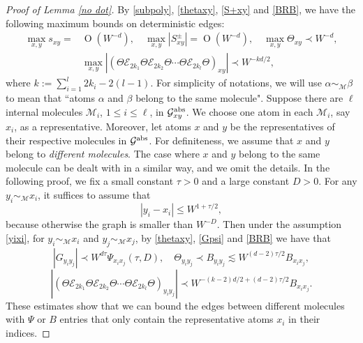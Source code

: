 \documentclass{article}
\newcommand{\1}{\mathds{1}}
\numberwithin{equation}{section}
\newcommand{\al}{\alpha}
\newcommand{\be}{\begin{equation}}
\newcommand{\ee}{\end{equation}}
\renewcommand{\cal}{\mathcal}
\renewcommand{\leq}{\leqslant}
\renewcommand{\le}{\leq}
\newcommand{\dashed}{\text{diffusive}}
\newcommand{\abs}{{\rm abs}}%
\DeclareMathOperator{\OO}{O}
\theoremstyle{plain} %
\theoremstyle{remark}
\newcommand{\Sele}{{\mathcal E}}
\newcommand{\Selek}{{\mathcal E}}
\newcommand{\Cele}{{\mathscr E}}
\begin{document}
\begin{proof} [Proof of Lemma \ref{no dot}]
By \eqref{subpoly}, \eqref{thetaxy}, \eqref{S+xy} and \eqref{BRB}, we have the following maximum bounds on deterministic edges:
\be\label{Ssmall}\begin{split}
	\max_{x,y}s_{xy} = & \OO   (W^{-d}), \quad  \max_{x,y}|S^{\pm}_{xy}|  = \OO(W^{-d}),\quad \max_{x,y}\Theta_{xy} \prec W^{-d}, \\
	& \max_{x,y}\left|(\Theta \Sele_{2k_1}\Theta  \Sele_{2k_2}\Theta \cdots \Theta  \Sele_{2k_l}\Theta)_{xy}\right|  \prec W^{-kd /2 } ,
\end{split}
\ee
where $k:=\sum_{i=1}^l 2 k_i -2(l-1)$. 
For simplicity of notations, we will use $\al\sim_{\cal M} \beta$ to mean that ``atoms $\al$ and $\beta$ belong to the same molecule". Suppose there are $\ell$ internal molecules $\cal M_i$, $1\le i \le \ell$, in $\cal G_{xy}^{\abs}$.  We choose one atom in each $\cal M_i$, say $x_i$, as a representative. Moreover, let atoms $x$ and $y$ be the representatives of their respective molecules in $\cal G^{\abs}$. For definiteness, we assume that $x$ and $y$ belong to \emph{different molecules}. The case where $x$ and $y$ belong to the same molecule can be dealt with in a similar way, and we omit the details. In the following proof, we fix a small constant $\tau>0$ and a large constant $D>0$. For any $y_i\sim_{\cal M}x_i$, it suffices to assume that  
\be\label{yixi}
|y_i-x_i|\le W^{1+\tau/2},
\ee
because otherwise the graph is smaller than $W^{-D}$. Then under the assumption \eqref{yixi}, for $y_i\sim_{\cal M} x_i$ and $y_j\sim_{\cal M} x_j$, by \eqref{thetaxy}, \eqref{Gpsi} and \eqref{BRB} we have that
\be\label{intermole1}|G_{y_i y_j}|\prec W^{d\tau} \Psi_{x_i x_j}(\tau, D) ,\quad \Theta_{y_i y_j}\prec B_{y_i y_j} \lesssim W^{(d-2)\tau/2} B_{x_i x_j},\ee
\be\label{intermole2} \left|(\Theta \Sele_{2k_1}\Theta  \Sele_{2k_2}\Theta \cdots \Theta  \Sele_{2k_l}\Theta)_{y_i y_j}\right| \prec W^{-(k-2)d /2 + (d-2)\tau/2} B_{x_i x_j}. \ee 
These estimates show that we can bound the edges between different molecules with $\Psi$ or $B$ entries that only contain the representative atoms $x_i$ in their indices. 
 

\end{proof}
\end{document}
